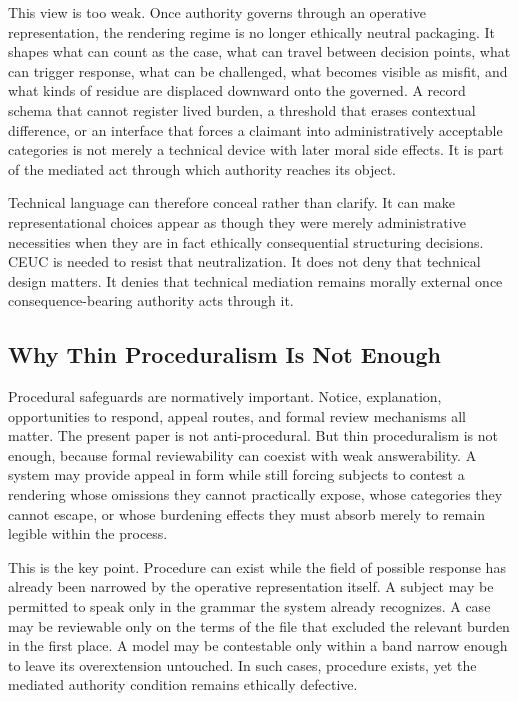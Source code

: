 \documentclass[11pt]{article}
\begin{document}
This view is too weak. Once authority governs through an operative representation, the rendering regime is no longer ethically neutral packaging. It shapes what can count as the case, what can travel between decision points, what can trigger response, what can be challenged, what becomes visible as misfit, and what kinds of residue are displaced downward onto the governed. A record schema that cannot register lived burden, a threshold that erases contextual difference, or an interface that forces a claimant into administratively acceptable categories is not merely a technical device with later moral side effects. It is part of the mediated act through which authority reaches its object. \cite{BowkerStar1999SortingThingsOut,LepriEtAl2018FairTransparentAccountableADM,Tabassi2023NISTAIRMF,Swanson2026MediatedJudgmentConstraint}

Technical language can therefore conceal rather than clarify. It can make representational choices appear as though they were merely administrative necessities when they are in fact ethically consequential structuring decisions. CEUC is needed to resist that neutralization. It does not deny that technical design matters. It denies that technical mediation remains morally external once consequence-bearing authority acts through it.

\subsection{Why Thin Proceduralism Is Not Enough}

Procedural safeguards are normatively important. Notice, explanation, opportunities to respond, appeal routes, and formal review mechanisms all matter. The present paper is not anti-procedural. But thin proceduralism is not enough, because formal reviewability can coexist with weak answerability. A system may provide appeal in form while still forcing subjects to contest a rendering whose omissions they cannot practically expose, whose categories they cannot escape, or whose burdening effects they must absorb merely to remain legible within the process. \cite{Fricker2007EpistemicInjustice,MoynihanHerdHarvey2015AdministrativeBurden,LepriEtAl2018FairTransparentAccountableADM}

This is the key point. Procedure can exist while the field of possible response has already been narrowed by the operative representation itself. A subject may be permitted to speak only in the grammar the system already recognizes. A case may be reviewable only on the terms of the file that excluded the relevant burden in the first place. A model may be contestable only within a band narrow enough to leave its overextension untouched. In such cases, procedure exists, yet the mediated authority condition remains ethically defective.
\end{document}
